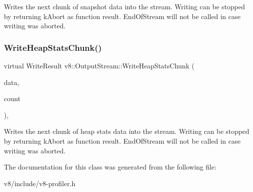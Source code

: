 Writes the next chunk of snapshot data into the stream. Writing can be stopped by returning k\+Abort as function result. End\+Of\+Stream will not be called in case writing was aborted. \mbox{\label{classv8_1_1OutputStream_a104fd1a0b5ef685e1d4967aaacbb9e9d}} 
\subsubsection{\texorpdfstring{Write\+Heap\+Stats\+Chunk()}{WriteHeapStatsChunk()}}
{\footnotesize\ttfamily virtual Write\+Result v8\+::\+Output\+Stream\+::\+Write\+Heap\+Stats\+Chunk (\begin{DoxyParamCaption}\item[{\mbox{\hyperlink{structv8_1_1HeapStatsUpdate}{Heap\+Stats\+Update}} $\ast$}]{data,  }\item[{int}]{count }\end{DoxyParamCaption})\hspace{0.3cm}{\ttfamily [inline]}, {\ttfamily [virtual]}}

Writes the next chunk of heap stats data into the stream. Writing can be stopped by returning k\+Abort as function result. End\+Of\+Stream will not be called in case writing was aborted. 

The documentation for this class was generated from the following file\+:\begin{DoxyCompactItemize}
\item 
v8/include/v8-\/profiler.\+h\end{DoxyCompactItemize}
